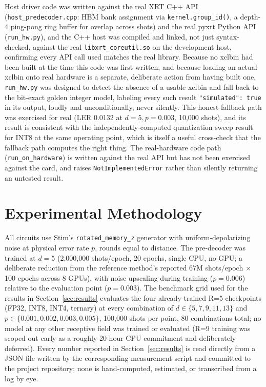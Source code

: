 \documentclass[pdflatex,sn-basic]{sn-jnl}
\begin{document}
Host driver code was written against the real XRT C++ API (\texttt{host\_predecoder.cpp}: HBM bank assignment via \texttt{kernel.group\_id()}, a depth-4 ping-pong ring buffer for overlap across shots) and the real pyxrt Python API (\texttt{run\_hw.py}), and the C++ host was compiled and linked, not just syntax-checked, against the real \texttt{libxrt\_coreutil.so} on the development host, confirming every API call used matches the real library. Because no xclbin had been built at the time this code was first written, and because loading an actual xclbin onto real hardware is a separate, deliberate action from having built one, \texttt{run\_hw.py} was designed to detect the absence of a usable xclbin and fall back to the bit-exact golden integer model, labeling every such result \texttt{"simulated": true} in its output, loudly and unconditionally, never silently. This honest-fallback path was exercised for real (LER 0.0132 at \(d=5, p=0.003\), 10{,}000 shots), and its result is consistent with the independently-computed quantization sweep result for INT8 at the same operating point, which is itself a useful cross-check that the fallback path computes the right thing. The real-hardware code path (\texttt{run\_on\_hardware}) is written against the real API but has not been exercised against the card, and raises \texttt{NotImplementedError} rather than silently returning an untested result.

\section{Experimental Methodology}\label{sec:methodology}

All circuits use Stim's \texttt{rotated\_memory\_z} generator with uniform-depolarizing noise at physical error rate \(p\), rounds equal to distance. The pre-decoder was trained at \(d=5\) (2{,}000{,}000 shots/epoch, 20 epochs, single CPU, no GPU; a deliberate reduction from the reference method's reported 67M shots/epoch $\times$ 100 epochs across 8 GPUs), with noise upscaling during training (\(p=0.006\)) relative to the evaluation point (\(p=0.003\)). The benchmark grid used for the results in Section~\ref{sec:results} evaluates the four already-trained R=5 checkpoints (FP32, INT8, INT4, ternary) at every combination of \(d \in \{5,7,9,11,13\}\) and \(p \in \{0.001, 0.002, 0.003, 0.005\}\), 100{,}000 shots per point, 80 combinations total; no model at any other receptive field was trained or evaluated (R=9 training was scoped out early as a roughly 20-hour CPU commitment and deliberately deferred). Every number reported in Section~\ref{sec:results} is read directly from a JSON file written by the corresponding measurement script and committed to the project repository; none is hand-computed, estimated, or transcribed from a log by eye.
\end{document}
